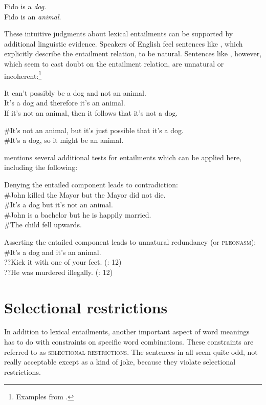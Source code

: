 \ea \label{ex:7.4}
\ea Fido is a \textit{dog}.\\
\ex Fido is an \textit{animal}.
                       \z
\z


These intuitive judgments about lexical entailments can be supported by additional linguistic evidence. Speakers of English feel sentences like , which explicitly describe the entailment relation, to be natural. Sentences like , however, which seem to cast doubt on the entailment relation, are unnatural or incoherent:\footnote{Examples from \citet[14]{Cruse1986}.}


\ea \label{ex:7.5}
\ea It can’t possibly be a dog and not an animal.\\
\ex It’s a dog and therefore it’s an animal.\\
\ex If it’s not an animal, then it follows that it’s not a dog.
                       \z
\z

\ea \label{ex:7.6}
\ea \#It’s not an animal, but it’s just possible that it’s a dog.\\
\ex \#It’s a dog, so it might be an animal.
                       \z
\z


\citet[12]{Cruse1986} mentions several additional tests for entailments which can be applied here, including the following:


\ea \label{ex:7.7}
Denying the entailed component leads to contradiction:\\
\ea \#John killed the Mayor but the Mayor did not die.\\
\ex \#It’s a dog but it’s not an animal.\\
\ex \#John is a bachelor but he is happily married.\\
\ex \#The child fell upwards.
\z
                       \z

\ea \label{ex:7.8}
Asserting the entailed component leads to unnatural redundancy (or \textsc{pleonasm}):\\
\ea \#It’s a dog and it’s an animal.\\
\ex ??Kick it with one of your feet.  (\citealt{Cruse1986}: 12)\\
\ex ??He was murdered illegally.  (\citealt{Cruse1986}: 12)
                       \z
\z

\section{Selectional restrictions}\label{sec:7.3}

In addition to lexical entailments, another important aspect of word meanings has to do with constraints on specific word combinations. These constraints are referred to as \textsc{selectional restrictions}. The sentences in  all seem quite odd, not really acceptable except as a kind of joke, because they violate selectional restrictions.


